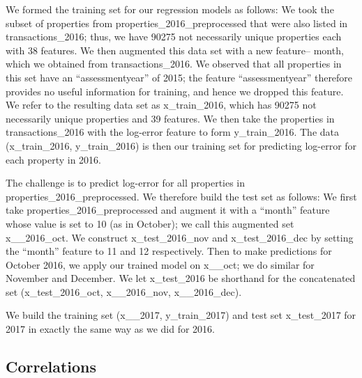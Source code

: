 \documentclass[12pt]{article}
\begin{document}
We formed the training set for our regression models as follows: We took the subset of properties from properties\_2016_preprocessed that were also listed in transactions\_2016; thus, we have 90275 not necessarily unique properties each with 38 features. We then augmented this data set with a new feature-- month, which we obtained from transactions\_2016. We observed that all properties in this set have an ``assessmentyear'' of 2015; the feature ``assessmentyear'' therefore provides no useful information for training, and hence we dropped this feature. We refer to the resulting data set as x\_train\_2016, which has 90275 not necessarily unique properties and 39 features. We then take the properties in transactions\_2016 with the log-error feature to form y\_train\_2016. The data (x\_train\_2016, y\_train\_2016) is then our training set for predicting log-error for each property in 2016.

The challenge is to predict log-error for all properties in properties\_2016\_preprocessed. We therefore build the test set as follows: We first take properties\_2016\_preprocessed and augment it with a ``month'' feature whose value is set to 10 (as in October); we call this augmented set x_\test\_2016\_oct. We construct x\_test\_2016\_nov and x\_test\_2016\_dec by setting the ``month'' feature to 11 and 12 respectively. Then to make predictions for October 2016, we apply our trained model on x_\test\_oct; we do similar for November and December. We let x\_test\_2016 be shorthand for the concatenated set (x\_test\_2016\_oct, x_\test\_2016\_nov, x_\test\_2016\_dec).

We build the training set (x_\train\_2017, y\_train\_2017) and test set x\_test\_2017 for 2017 in exactly the same way as we did for 2016.

\subsection{Correlations}
\end{document}

